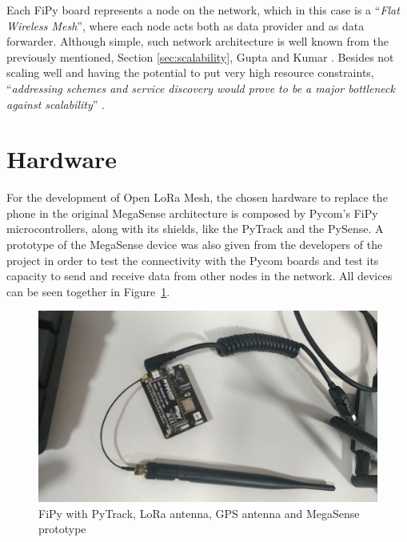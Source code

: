 		Each FiPy board represents a node on the network, which in this case is a ``\textit{Flat Wireless Mesh}'', where each node acts both as data provider and as data forwarder.
		Although simple, such network architecture is well known from the previously mentioned, Section \ref{sec:scalability}, Gupta and Kumar \cite{825799}.
		Besides not scaling well and having the potential to put very high resource constraints, ``\textit{addressing schemes and service discovery would prove to be a major bottleneck against scalability}'' \cite{92000412}.

	\section{Hardware}\label{sec:hardware_solution}
	
		
		For the development of Open LoRa Mesh, the chosen hardware to replace the phone in the original MegaSense architecture is composed by Pycom's FiPy microcontrollers, along with its shields, like the PyTrack and the PySense.
		A prototype of the MegaSense device was also given from the developers of the project in order to test the connectivity with the Pycom boards and test its capacity to send and receive data from other nodes in the network.
		All devices can be seen together in Figure~\ref{img:irl_picture_1}.
		
		\begin{figure}[h]
			\centering
			\includegraphics[width=\textwidth]{resources/img/chap5/mesh-irl-picture}
			\caption{FiPy with PyTrack, LoRa antenna, GPS antenna and MegaSense prototype}
			\label{img:irl_picture_1}
		\end{figure}
		

